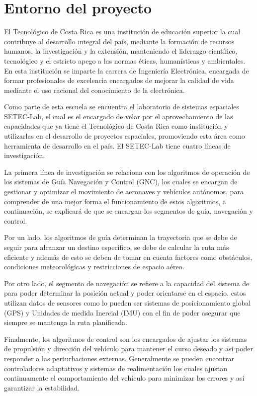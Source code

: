 \documentclass[12pt]{article}
\begin{document}
\newpage
\tableofcontents
\newpage

\section{Entorno del proyecto}
El Tecnológico de Costa Rica es una institución de educación superior la cual contribuye al desarrollo integral del país, mediante la formación de recursos humanos, la investigación y la extensión, manteniendo el liderazgo científico, tecnológico y el estricto apego a las normas éticas, humanísticas y ambientales. En esta institución se imparte la carrera de Ingeniería Electrónica, encargada de formar profesionales de excelencia encargados de mejorar la calidad de vida mediante el uso racional del conocimiento de la electrónica.

Como parte de esta escuela se encuentra el laboratorio de sistemas espaciales SETEC-Lab, el cual es el encargado de velar por el aprovechamiento de las capacidades que ya tiene el Tecnológico de Costa Rica como institución y utilizarlas en el desarrollo de proyectos espaciales, promoviendo esta área como herramienta de desarrollo en el país. El SETEC-Lab tiene cuatro líneas de investigación. 

La primera línea de investigación se relaciona con los algoritmos de operación de los sistemas de Guía Navegación y Control (GNC), los cuales se encargan de gestionar y optimizar el movimiento de aeronaves y vehículos autónomos, para comprender de una mejor forma el funcionamiento de estos algoritmos, a continuación, se explicará de que se encargan los segmentos de guía, navegación y control. 

Por un lado, los algoritmos de guía determinan la trayectoria que se debe de seguir para alcanzar un destino especifico, se debe de calcular la ruta más eficiente y además de esto se deben de tomar en cuenta factores como obstáculos, condiciones meteorológicas y restricciones de espacio aéreo. 

Por otro lado, el segmento de navegación se refiere a la capacidad del sistema de para poder determinar la posición actual y poder orientarse en el espacio. estos utilizan datos de sensores como lo pueden ser sistemas de posicionamiento global (GPS) y Unidades de medida Inercial (IMU) con el fin de poder asegurar que siempre se mantenga la ruta planificada. 

Finalmente, los algoritmos de control son los encargados de ajustar los sistemas de propulsión y dirección del vehículo para mantener el curso deseado y así poder responder a las perturbaciones externas. Generalmente se pueden encontrar controladores adaptativos y sistemas de realimentación los cuales ajustan continuamente el comportamiento del vehículo para minimizar los errores y así garantizar la estabilidad.
 
\end{document}
